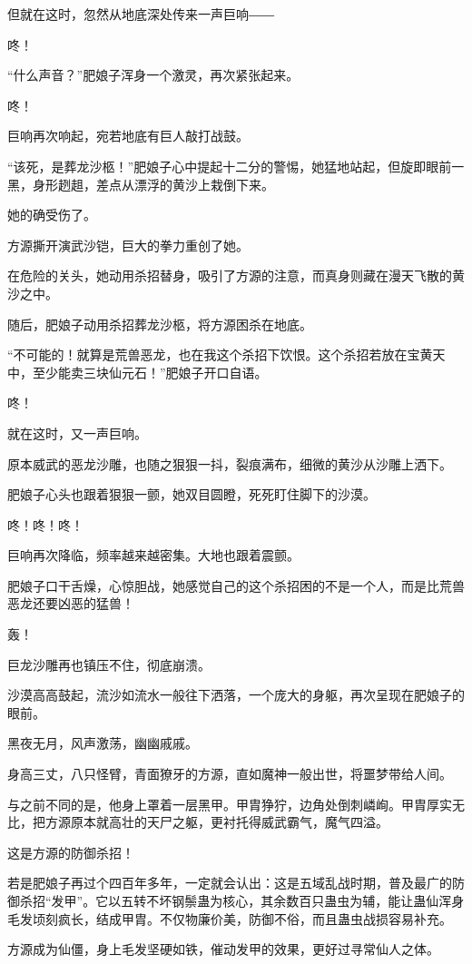 \begin{this_body}
但就在这时，忽然从地底深处传来一声巨响――

咚！

“什么声音？”肥娘子浑身一个激灵，再次紧张起来。

咚！

巨响再次响起，宛若地底有巨人敲打战鼓。

“该死，是葬龙沙柩！”肥娘子心中提起十二分的警惕，她猛地站起，但旋即眼前一黑，身形趔趄，差点从漂浮的黄沙上栽倒下来。

她的确受伤了。

方源撕开演武沙铠，巨大的拳力重创了她。

在危险的关头，她动用杀招替身，吸引了方源的注意，而真身则藏在漫天飞散的黄沙之中。

随后，肥娘子动用杀招葬龙沙柩，将方源困杀在地底。

“不可能的！就算是荒兽恶龙，也在我这个杀招下饮恨。这个杀招若放在宝黄天中，至少能卖三块仙元石！”肥娘子开口自语。

咚！

就在这时，又一声巨响。

原本威武的恶龙沙雕，也随之狠狠一抖，裂痕满布，细微的黄沙从沙雕上洒下。

肥娘子心头也跟着狠狠一颤，她双目圆瞪，死死盯住脚下的沙漠。

咚！咚！咚！

巨响再次降临，频率越来越密集。大地也跟着震颤。

肥娘子口干舌燥，心惊胆战，她感觉自己的这个杀招困的不是一个人，而是比荒兽恶龙还要凶恶的猛兽！

轰！

巨龙沙雕再也镇压不住，彻底崩溃。

沙漠高高鼓起，流沙如流水一般往下洒落，一个庞大的身躯，再次呈现在肥娘子的眼前。

黑夜无月，风声激荡，幽幽戚戚。

身高三丈，八只怪臂，青面獠牙的方源，直如魔神一般出世，将噩梦带给人间。

与之前不同的是，他身上罩着一层黑甲。甲胄狰狞，边角处倒刺嶙峋。甲胄厚实无比，把方源原本就高壮的天尸之躯，更衬托得威武霸气，魔气四溢。

这是方源的防御杀招！

若是肥娘子再过个四百年多年，一定就会认出：这是五域乱战时期，普及最广的防御杀招“发甲”。它以五转不坏钢鬃蛊为核心，其余数百只蛊虫为辅，能让蛊仙浑身毛发顷刻疯长，结成甲胄。不仅物廉价美，防御不俗，而且蛊虫战损容易补充。

方源成为仙僵，身上毛发坚硬如铁，催动发甲的效果，更好过寻常仙人之体。


\end{this_body}
